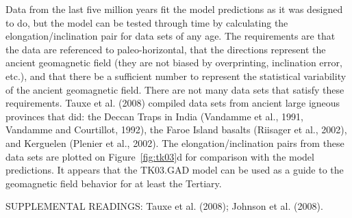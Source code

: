  Data from the last five million years fit the model predictions as it was designed to do, but the model can be tested through time by calculating the elongation/inclination pair for data sets of any age.  The requirements are that the data are referenced to paleo-horizontal,  that the directions represent the ancient geomagnetic field (they are not biased by overprinting, inclination error, etc.), and that there be a sufficient number to represent the statistical variability of the ancient geomagnetic field.   There are not many data sets that satisfy these requirements.  Tauxe et al. (2008) compiled  data sets from ancient large igneous provinces that did:   the Deccan Traps in India (Vandamme et al., 1991, Vandamme and Courtillot, 1992), the Faroe Island basalts (Riisager et al., 2002), and Kerguelen (Plenier et al., 2002).  The elongation/inclination pairs from these data sets are plotted on Figure~\ref{fig:tk03}d for comparison with the model predictions.    It appears that the TK03.GAD model can be used as a guide to the geomagnetic field behavior for at least the Tertiary.   
\vskip 24pt

\noindent SUPPLEMENTAL READINGS:  Tauxe et al. (2008); Johnson et al. (2008).  \nocite{tauxe08,johnson08}


